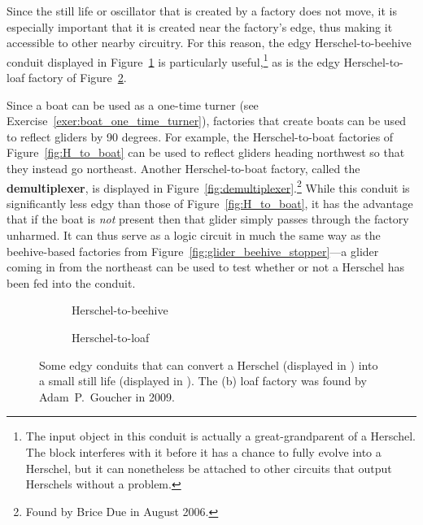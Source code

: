 Since the still life or oscillator that is created by a factory does not move, it is especially important that it is created near the factory's edge, thus making it accessible to other nearby circuitry. For this reason, the edgy Herschel-to-beehive conduit displayed in Figure~\ref{fig:H_to_beehive} is particularly useful,\footnote{The input object in this conduit is actually a great-grandparent of a Herschel. The block interferes with it before it has a chance to fully evolve into a Herschel, but it can nonetheless be attached to other circuits that output Herschels without a problem.} as is the edgy Herschel-to-loaf factory of Figure~\ref{fig:H_to_loaf}.

Since a boat can be used as a one-time turner (see Exercise~\ref{exer:boat_one_time_turner}), factories that create boats can be used to reflect gliders by 90 degrees. For example, the Herschel-to-boat factories of Figure~\ref{fig:H_to_boat} can be used to reflect gliders heading northwest so that they instead go northeast. Another Herschel-to-boat factory, called the \textbf{demultiplexer}, is displayed in Figure~\ref{fig:demultiplexer}.\footnote{Found by Brice Due in August 2006.} While this conduit is significantly less edgy than those of Figure~\ref{fig:H_to_boat}, it has the advantage that if the boat is \emph{not} present then that glider simply passes through the factory unharmed. It can thus serve as a logic circuit in much the same way as the beehive-based factories from Figure~\ref{fig:glider_beehive_stopper}---a glider coming in from the northeast can be used to test whether or not a Herschel has been fed into the conduit.

\begin{figure}[!htb]
	\centering
	\begin{subfigure}{.38\textwidth}
		\centering{}
		\caption{Herschel-to-beehive}\label{fig:H_to_beehive}
	\end{subfigure} \hfill
	\begin{subfigure}{.58\textwidth}
		\centering{}
		\caption{Herschel-to-loaf}\label{fig:H_to_loaf}
	\end{subfigure}
	\caption{Some edgy conduits that can convert a Herschel (displayed in ) into a small still life (displayed in ). The (b) loaf factory was found by Adam~P.~Goucher in 2009.}
	\label{fig:H_to_beehive_loaf}
\end{figure}

